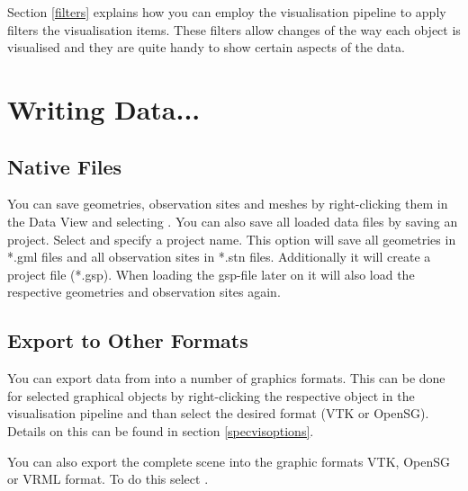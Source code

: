 Section \ref{filters} explains how you can employ the visualisation pipeline to apply filters the visualisation items. These filters allow changes of the way each object is visualised and they are quite handy to show certain aspects of the data.

\section{Writing Data...}

\subsection{Native Files}
You can save geometries, observation sites and meshes by right-clicking them in the Data View and selecting . You can also save all loaded data files by saving an \ogs project. Select  and specify a project name. This option will save all geometries in *.gml files and all observation sites in *.stn files. Additionally it will create a project file (*.gsp). When loading the gsp-file later on it will also load the respective geometries and observation sites again.

\subsection{Export to Other Formats}

You can export data from \ogs into a number of graphics formats. This can be done for selected graphical objects by right-clicking the respective object in the visualisation pipeline and than select the desired format (VTK or OpenSG). Details on this can be found in section \ref{specvisoptions}.

You can also export the complete scene into the graphic formats VTK, OpenSG or VRML format. To do this select . 